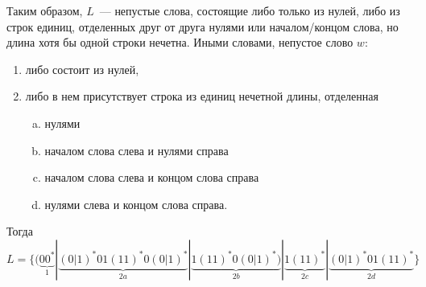 \documentclass[a4paper]{article}
\begin{document}
Таким образом, $L$~--- непустые слова, состоящие либо только из нулей, либо из строк единиц, отделенных друг от друга нулями или началом/концом слова, но длина хотя бы одной строки нечетна. Иными словами, непустое слово $w$:
\begin{enumerate}[1.]
\item либо состоит из нулей,
\item либо в нем присутствует строка из единиц нечетной длины, отделенная
\begin{enumerate}[a.]
 \item нулями
 \item началом слова слева и нулями справа
 \item началом слова слева и концом слова справа
 \item нулями слева и концом слова справа.
\end{enumerate}
\end{enumerate}
Тогда $L=\{(\underbrace{00^*}_{1}|\underbrace{{(0|1)}^*01{(11)}^*0{(0|1)}^*}_{2a}|\underbrace{1{(11)}^*0{(0|1)}^*)}_{2b}|\underbrace{1{(11)}^*}_{2c}|\underbrace{{(0|1)}^*01{(11)}^*}_{2d}\}$
\end{document}
